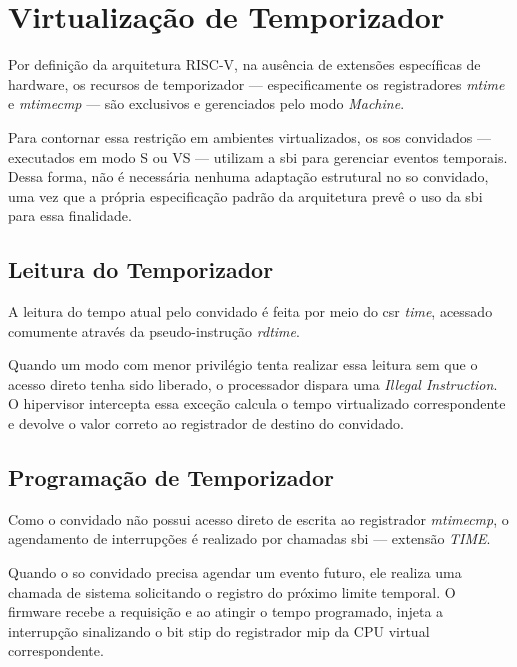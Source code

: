 \section{Virtualização de Temporizador}

Por definição da arquitetura RISC-V, na ausência de extensões específicas de hardware, os recursos de temporizador — especificamente os registradores \textit{mtime} e \textit{mtimecmp} —
são exclusivos e gerenciados pelo modo \textit{Machine}.

Para contornar essa restrição em ambientes virtualizados, os \glspl{so} convidados --- executados em modo S ou VS --- utilizam a \gls{sbi} para gerenciar eventos temporais.
Dessa forma, não é necessária nenhuma adaptação estrutural no \gls{so} convidado, uma vez que a própria especificação padrão da arquitetura prevê o uso da \gls{sbi} para essa finalidade.

\subsection{Leitura do Temporizador}

A leitura do tempo atual pelo convidado é feita por meio do \gls{csr} \textit{time}, acessado comumente através da pseudo-instrução \textit{rdtime}.

Quando um modo com menor privilégio tenta realizar essa leitura sem que o acesso direto tenha sido liberado, o processador dispara uma \textit{Illegal Instruction}. O hipervisor intercepta essa exceção
calcula o tempo virtualizado correspondente e devolve o valor correto ao registrador de destino do convidado.

\subsection{Programação de Temporizador}

Como o convidado não possui acesso direto de escrita ao registrador \textit{mtimecmp}, o agendamento de interrupções é realizado por chamadas \gls{sbi} --- extensão \textit{TIME}.

Quando o \gls{so} convidado precisa agendar um evento futuro, ele realiza uma chamada de sistema solicitando o registro do próximo limite temporal. O firmware
recebe a requisição e ao atingir o tempo programado, injeta a interrupção sinalizando o bit \gls{stip} do registrador \gls{mip} da CPU virtual correspondente.
